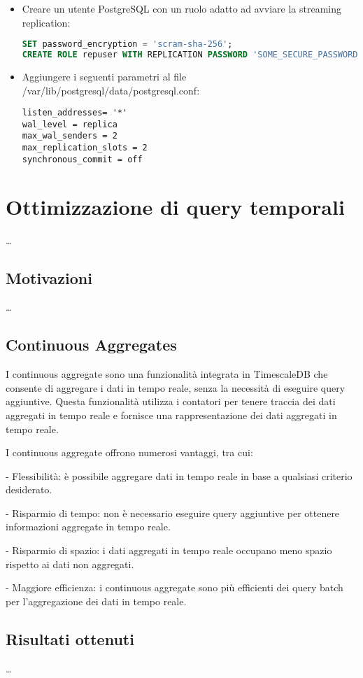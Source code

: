 \begin{itemize}
  \item Creare un utente PostgreSQL con un ruolo adatto ad avviare la streaming replication:
   \begin{lstlisting}[language=sql, caption=Python example]
SET password_encryption = 'scram-sha-256'; 
CREATE ROLE repuser WITH REPLICATION PASSWORD 'SOME_SECURE_PASSWORD' LOGIN;\end{lstlisting}
  \item Aggiungere i seguenti parametri al file /var/lib/postgresql/data/postgresql.conf:
  \begin{lstlisting}[caption=Python example]
listen_addresses= '*'
wal_level = replica
max_wal_senders = 2
max_replication_slots = 2
synchronous_commit = off
\end{lstlisting}
\end{itemize}

\section{Ottimizzazione di query temporali}\label{sec:cont-aggr}
\ldots

\subsection{Motivazioni}\label{ssec:cont-aggr-motivazioni}
\ldots

\subsection{Continuous Aggregates}\label{ssec:cont-aggr}
I continuous aggregate sono una funzionalità integrata in TimescaleDB che consente di aggregare i dati in tempo reale, senza la necessità di eseguire query aggiuntive. Questa funzionalità utilizza i contatori per tenere traccia dei dati aggregati in tempo reale e fornisce una rappresentazione dei dati aggregati in tempo reale.

I continuous aggregate offrono numerosi vantaggi, tra cui:

- Flessibilità: è possibile aggregare dati in tempo reale in base a qualsiasi criterio desiderato.

- Risparmio di tempo: non è necessario eseguire query aggiuntive per ottenere informazioni aggregate in tempo reale.

- Risparmio di spazio: i dati aggregati in tempo reale occupano meno spazio rispetto ai dati non aggregati.

- Maggiore efficienza: i continuous aggregate sono più efficienti dei query batch per l'aggregazione dei dati in tempo reale.

\subsection{Risultati ottenuti}\label{ssec:cont-aggr-risultati}
\ldots